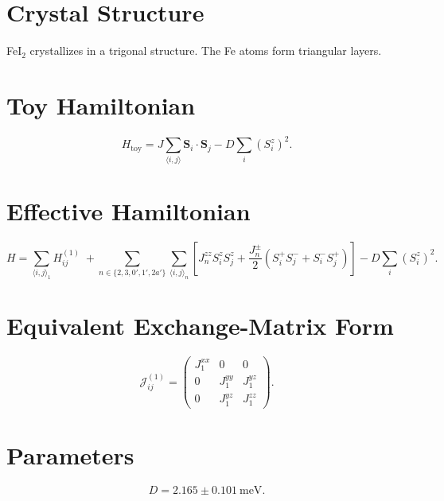 \documentclass[11pt]{article}
\begin{document}
\section*{Crystal Structure}

FeI$_2$ crystallizes in a trigonal structure. The Fe atoms form triangular layers.

\section*{Toy Hamiltonian}

\begin{equation}
H_{\mathrm{toy}}=
J\sum_{\langle i,j\rangle}\bm S_i\cdot\bm S_j
-D\sum_i (S_i^z)^2.
\end{equation}

\section*{Effective Hamiltonian}

\begin{equation}
H=
\sum_{\langle i,j\rangle_1}H_{ij}^{(1)}
\;+\!
\sum_{n\in\{2,3,0',1',2a'\}}
\sum_{\langle i,j\rangle_n}
\left[
J_n^{zz}S_i^zS_j^z
+
\frac{J_n^{\pm}}{2}(S_i^+S_j^-+S_i^-S_j^+)
\right]
-D\sum_i (S_i^z)^2 .
\end{equation}

\section*{Equivalent Exchange-Matrix Form}

\begin{equation}
\mathcal J_{ij}^{(1)}=
\begin{pmatrix}
J_1^{xx} & 0 & 0 \\
0 & J_1^{yy} & J_1^{yz} \\
0 & J_1^{yz} & J_1^{zz}
\end{pmatrix}.
\end{equation}

\section*{Parameters}

\begin{equation}
D = 2.165 \pm 0.101~\text{meV}.
\end{equation}
\end{document}
